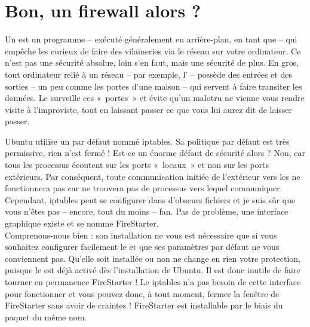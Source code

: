 \section{Bon, un firewall alors ?}
Un  est un programme -- exécuté généralement en arrière-plan, en tant que  -- qui empêche les curieux de faire des vilaineries via le réseau sur votre ordinateur. Ce n'est pas une sécurité absolue, loin s'en faut, mais une sécurité de plus. En gros, tout ordinateur relié à un réseau -- par exemple, l' -- possède des entrées et des sorties -- un peu comme les portes d'une maison -- qui servent à faire transiter les données. Le  surveille ces «~portes~» et évite qu'un malotru ne vienne vous rendre visite à l'improviste, tout en laissant passer ce que vous lui aurez dit de laisser passer.\par
Ubuntu utilise un  par défaut nommé iptables. Sa politique par défaut est très permissive, rien n'est fermé ! Est-ce un énorme défaut de sécurité alors ? Non, car tous les processus écoutent sur les ports «~locaux~» et non sur les ports extérieurs. Par conséquent, toute communication initiée de l'extérieur vers les  ne fonctionnera pas car ne trouvera pas de processus vers lequel communiquer. Cependant, iptables peut se configurer dans d'obscurs fichiers  et je suis sûr que vous n'êtes pas -- encore, tout du moins -- fan. Pas de problème, une interface graphique existe et se nomme FireStarter.\\
Comprenons-nous bien : son installation ne vous est nécessaire que si vous souhaitez configurer facilement le  et que ses paramètres par défaut ne vous conviennent pas. Qu'elle soit installée ou non ne change en rien votre protection, puisque le  est déjà activé dès l'installation de Ubuntu. Il est donc inutile de faire tourner en permanence FireStarter ! Le  iptables n'a pas besoin de cette interface pour fonctionner et vous pouvez donc, à tout moment, fermer la fenêtre de FireStarter sans avoir de craintes ! FireStarter est installable par le biais du paquet du même nom.
